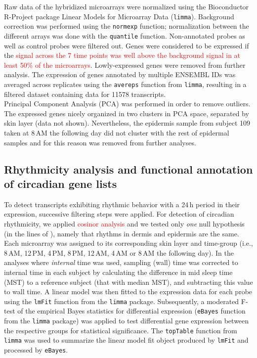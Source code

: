 Raw data of the hybridized microarrays were normalized using the Bioconductor R-Project package Linear Models for Microarray Data (\texttt{limma}). Background correction was performed using the \texttt{normexp} function; normalization between the different arrays was done with the \texttt{quantile} function. Non-annotated probes as well as control probes were filtered out. Genes were considered to be expressed if the \textcolor{red}{signal across the 7 time points was well above the background signal in at least 50\% of the microarrays}. Lowly-expressed genes were removed from further analysis. The expression of genes annotated by multiple ENSEMBL IDs was averaged across replicates using the \texttt{avereps} function from \texttt{limma}, resulting in a filtered dataset containing data for 11578 transcripts. \\

Principal Component Analysis (PCA) was performed in order to remove outliers. The expressed genes nicely organized in two clusters in PCA space, separated by skin layer (data not shown). Nevertheless, the epidermis sample from subject 109 taken at 8\,AM the following day did not cluster with the rest of epidermal samples and for this reason was removed from further analyses. 

\subsection*{Rhythmicity analysis and functional annotation of circadian gene lists}
To detect transcripts exhibiting rhythmic behavior with a 24\,h period in their expression, successive filtering steps were applied. For detection of circadian rhythmicity, we applied \textcolor{red}{cosinor analysis} and we tested only \textit{one} null hypothesis (in the lines of \cite{Pelikan2021}), namely that rhythms in dermis and epidermis are the same. Each microarray was assigned to its corresponding skin layer and time-group (i.e., 8\,AM, 12\,PM, 4\,PM, 8\,PM, 12\,AM, 4\,AM or 8\,AM the following day). In the analyses where \textit{internal} time was used, sampling (wall) time was corrected to internal time in each subject by calculating the difference in mid sleep time (MST) to a reference subject (that with median MST), and subtracting this value to wall time. A linear model was then fitted to the expression data for each probe using the \texttt{lmFit} function from the \texttt{limma} package. Subsequently, a moderated F-test of the empirical Bayes statistics for differential expression (\texttt{eBayes} function from the \texttt{limma} package) was applied to test differential gene expression between the respective groups for statistical significance. The \texttt{topTable} function from \texttt{limma} was used to summarize the linear model fit object produced by \texttt{lmFit} and processed by \texttt{eBayes}. \\ %

